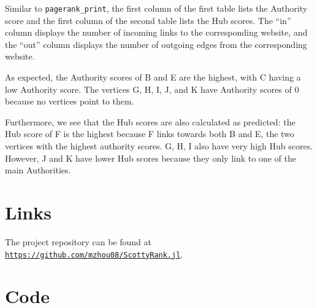 \documentclass[12pt, titlepage, twoside]{amsart}
\begin{document}
Similar to \texttt{pagerank_print}, the first column
of the first table lists the Authority score
and the first column of the second table lists the Hub scores.
The ``in'' column displays the number of incoming links to the corresponding website,
and the ``out'' column displays the number of outgoing edges from the corresponding website.

As expected, the Authority scores of B and E are the highest, with C having a low Authority score.
The vertices G, H, I, J, and K have Authority scores of 0 because no vertices point to them.

Furthermore, we see that the Hub scores are also calculated as predicted:
the Hub score of F is the highest because F links towards both B and E,
the two vertices with the highest authority scores. G, H, I also
have very high Hub scores. However, J and K have lower Hub scores because they only link to one of the main Authorities.




\appendix

\section{Links}

The project repository can be found at
\href{https://github.com/mzhou08/ScottyRank.jl}{\texttt{https://github.com/mzhou08/ScottyRank.jl}}.

\section{Code}

\inputminted{julia}{../src/ScottyRank.jl}
\end{document}
